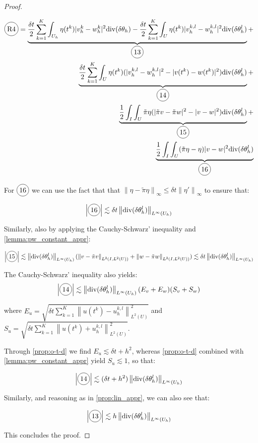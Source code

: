\documentclass[english,a4paper,9pt,oneside]{scrbook}	%
\theoremstyle{break}
\newenvironment{mproof}[1][\proofname]{%
  \begin{proof}[#1]$ $\par\nobreak\ignorespaces
}{%
  \end{proof}
}
\renewcommand*{\proofname}{Proof}
\theoremstyle{remark}
\newcommand{\ds}{\displaystyle}
\newcommand{\norm}[1]{\left\lVert#1\right\rVert}
\newcommand{\te}{\theta}
\newcommand{\dive}{\text{div}}
\newcommand*\circled[1]{\tikz[baseline=(char.base)]{
            \node[shape=circle,draw,inner sep=2pt] (char) {#1};}}
\begin{document}
\begin{mproof}
\begin{align*}
\circled{R4} =\underbrace{ \frac{\delta t}{2} \sum_{k=1}^{K} \int_{U_h} \eta(t^k)|v_h^k-w_h^k|^2  \dive(\delta \theta_h ) - \frac{\delta t}{2} \sum_{k=1}^{K}\int_{U} \eta(t^k) |v_h^{k,l}-w_h^{k,l}|^2\dive(\delta \te_h^l)}_{\circled{13}}+\\
\underbrace{\frac{\delta t}{2} \sum_{k=1}^{K}\int_{U} \eta(t^k) (|v_h^{k,l}-w_h^{k,l}|^2- |v(t^k)-w(t^k)|^2)\dive(\delta \te_h^l)}_{\circled{14}}+\\
\underbrace{\frac{1}{2}\int_I\int_{U}\tilde{\pi} \eta (|\tilde{\pi} v-\tilde{\pi} w|^2-|v-w|^2)\dive(\delta \te_h^l)}_{\circled{15}}+\\
\underbrace{\frac{1}{2}\int_I\int_{U}(\tilde{\pi} \eta - \eta) |v-w|^2\dive(\delta \te_h^l)}_{\circled{16}}
\end{align*}

For $\circled{16}$ we can use the fact that that $\norm{\eta -\tilde{\pi} \eta}_\infty\leq \delta t \norm{\eta'}_\infty$ to ensure that:

\begin{align*}
	\left | \circled{16} \right |\lesssim \delta t \norm{\dive(\delta \te_h^l)}_{L^\infty(U_h)}
\end{align*}

Similarly, also by applying the Cauchy-Schwarz' inequality and \cref{lemma:pw_constant_appr}:

\begin{align*}
	\left | \circled{15} \right |\lesssim  \norm{\dive(\delta \te_h^l)}_{L^\infty(U_h)} (\norm{v-\tilde{\pi} v}_{L^2(I,L^2(U))}+\norm{w-\tilde{\pi} w}_{L^2(I,L^2(U))})\lesssim \delta t \norm{\dive(\delta \te_h^l)}_{L^\infty(U_h)}
\end{align*}

The Cauchy-Schwarz' inequality also yields:
\begin{align*}
	\left | \circled{14} \right | \lesssim \norm{\dive(\delta \te_h^l)}_{L^\infty(U_h)}(E_v+E_w)(S_v+S_w)
\end{align*}

where $\ds E_u = \sqrt{\delta t \sum_{k=1}^{K}\norm{u(t^k)-u_h^{k,l}}_{L^2(U)}^2}$ and $\ds S_u = \sqrt{\delta t \sum_{k=1}^{K}\norm{u(t^k)+u_h^{k,l}}_{L^2(U)}^2} $.

Through \cref{prop:o-t-d} we find $E_u \lesssim \delta t + h^2$, whereas \cref{prop:o-t-d} combined with \cref{lemma:pw_constant_appr} yield $S_u \lesssim 1$, so that:

\begin{align*}
	\left | \circled{14} \right | \lesssim (\delta t + h^2)\norm{\dive(\delta \te_h^l)}_{L^\infty(U_h)}
\end{align*}


Similarly, and reasoning as in \cref{prop:lin_appr}, we can also see that:

\begin{align*}
	\left | \circled{13} \right | \lesssim h \norm{\dive(\delta \te_h^l)}_{L^\infty(U_h)}
\end{align*}

This concludes the proof.

\end{mproof}
\end{document}
